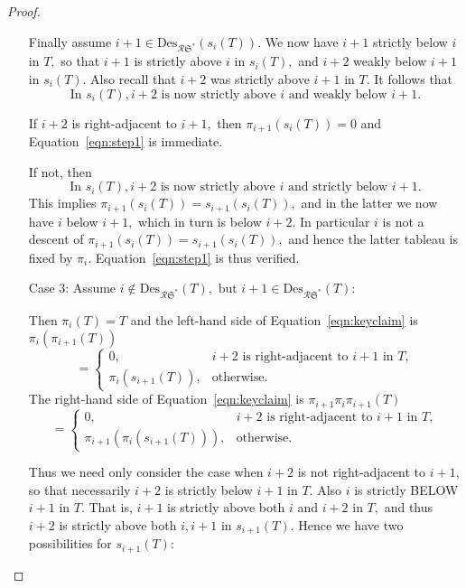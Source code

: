 \documentclass[12pt,letterpaper]{amsart}
\theoremstyle{definition}
\begin{document}
\begin{proof}
\begin{enumerate}
Finally assume $i+1\in \mathrm{Des}_{\mathcal{R}\mathfrak{S^*}}(s_i(T)).$   We now have $i+1$ strictly below $i$ in $T,$ so that $i+1$ is strictly above $i$ in $s_i(T),$ and $i+2$ weakly below $i+1$ in $s_i(T).$   Also recall that $i+2$ was strictly above $i+1$ in $T.$ It follows that 
\begin{equation}\label{eqn:step2} \text{In } s_i(T),  i+2 \text{ is now strictly above } i 
\text{ and weakly below }i+1. \end{equation}



If $i+2$ is right-adjacent to $i+1,$ then $\pi_{i+1}(s_i(T))=0$ and Equation~\eqref{eqn:step1} is immediate.

If not, then 
\begin{equation}\label{eqn:step3} \text{In } s_i(T),  i+2 \text{ is now strictly above } i 
\text{ and strictly below }i+1. \end{equation} 
This implies $\pi_{i+1}(s_i(T))=s_{i+1}(s_i(T)),$ and in the latter we now have $i$ below $i+1,$ which in turn is below $i+2.$ In particular $i$ is not a descent of $\pi_{i+1}(s_i(T))=s_{i+1}(s_i(T)),$ and hence the latter tableau is fixed by $\pi_i.$ Equation~\eqref{eqn:step1} is thus verified.

\item[Case 3:]  Assume $i\notin \mathrm{Des}_{\mathcal{R}\mathfrak{S^*}}(T), \text{ but }i+1\in \mathrm{Des}_{\mathcal{R}\mathfrak{S^*}}(T)$: 

Then $\pi_i(T)=T$ and the left-hand side of Equation~\eqref{eqn:keyclaim} is $\pi_i(\pi_{i+1}(T))$ 
\[=\begin{cases} 0, & i+2 \text{ is right-adjacent to } i+1 \text{ in } T, \\
                          \pi_i(s_{i+1}(T)), 
                          &\text{otherwise.} \end{cases}\]
The right-hand side of Equation~\eqref{eqn:keyclaim} is $\pi_{i+1}\pi_i\pi_{i+1}(T)$ 
\[=\begin{cases} 0, &i+2 \text{ is right-adjacent to } i+1 \text{ in } T, \\
                          \pi_{i+1}(\pi_i(s_{i+1}(T))), &\text{otherwise.} \end{cases}\]
                          
Thus we need only consider the case when $i+2$  is not right-adjacent to $i+1$, so that necessarily $i+2$ is strictly below $i+1$ in $T.$ Also $i$ is  strictly BELOW $i+1$ in $T$. That is, $i+1$ is strictly above both $i$ and $i+2$ in $T,$ and thus  $i+2$ is strictly above both $i,i+1$ in $s_{i+1}(T).$ 
Hence we have  two possibilities for $s_{i+1}(T)$:


\end{enumerate}
\end{proof}
\end{document}
